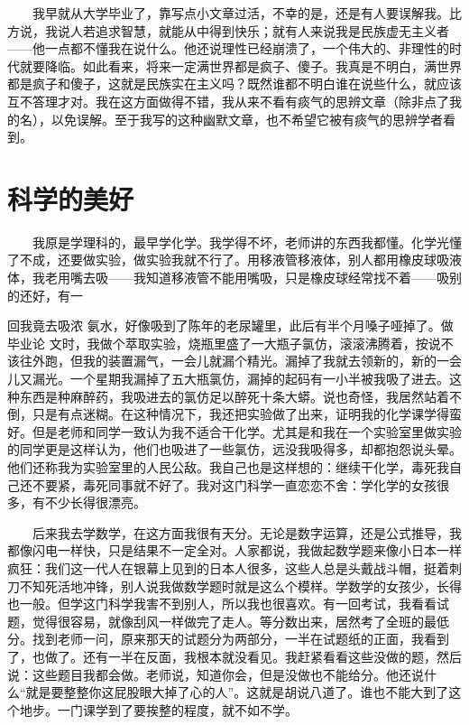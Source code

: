 　　我早就从大学毕业了，靠写点小文章过活，不幸的是，还是有人要误解我。比方说，我说人若追求智慧，就能从中得到快乐；就有人来说我是民族虚无主义者——他一点都不懂我在说什么。他还说理性已经崩溃了，一个伟大的、非理性的时代就要降临。如此看来，将来一定满世界都是疯子、傻子。我真是不明白，满世界都是疯子和傻子，这就是民族实在主义吗？既然谁都不明白谁在说些什么，就应该互不答理才对。我在这方面做得不错，我从来不看有痰气的思辨文章（除非点了我的名），以免误解。至于我写的这种幽默文章，也不希望它被有痰气的思辨学者看到。

\chapter{科学的美好}

　　我原是学理科的，最早学化学。我学得不坏，老师讲的东西我都懂。化学光懂了不成，还要做实验，做实验我就不行了。用移液管移液体，别人都用橡皮球吸液体，我老用嘴去吸——我知道移液管不能用嘴吸，只是橡皮球经常找不着——吸别的还好，有一

回我竟去吸浓
氨水，好像吸到了陈年的老尿罐里，此后有半个月嗓子哑掉了。做毕业论
文时，我做个萃取实验，烧瓶里盛了一大瓶子氯仿，滚滚沸腾着，按说不该往外跑，但我的装置漏气，一会儿就漏个精光。漏掉了我就去领新的，新的一会儿又漏光。一个星期我漏掉了五大瓶氯仿，漏掉的起码有一小半被我吸了进去。这种东西是种麻醉药，我吸进去的氯仿足以醉死十条大蟒。说也奇怪，我居然站着不倒，只是有点迷糊。在这种情况下，我还把实验做了出来，证明我的化学课学得蛮好。但是老师和同学一致认为我不适合干化学。尤其是和我在一个实验室里做实验的同学更是这样认为，他们也吸进了一些氯仿，远没我吸得多，却都抱怨说头晕。他们还称我为实验室里的人民公敌。我自己也是这样想的：继续干化学，毒死我自己还不要紧，毒死同事就不好了。我对这门科学一直恋恋不舍：学化学的女孩很多，有不少长得很漂亮。

　　后来我去学数学，在这方面我很有天分。无论是数字运算，还是公式推导，我都像闪电一样快，只是结果不一定全对。人家都说，我做起数学题来像小日本一样疯狂：我们这一代人在银幕上见到的日本人很多，这些人总是头戴战斗帽，挺着刺刀不知死活地冲锋，别人说我做数学题时就是这么个模样。学数学的女孩少，长得也一般。但学这门科学我害不到别人，所以我也很喜欢。有一回考试，我看看试题，觉得很容易，就像刮风一样做完了走人。等分数出来，居然考了全班的最低分。找到老师一问，原来那天的试题分为两部分，一半在试题纸的正面，我看到了，也做了。还有一半在反面，我根本就没看见。我赶紧看看这些没做的题，然后说：这些题目我都会做。老师说，知道你会，但是没做也不能给分。他还说什么“就是要整整你这屁股眼大掉了心的人”。这就是胡说八道了。谁也不能大到了这个地步。一门课学到了要挨整的程度，就不如不学。

